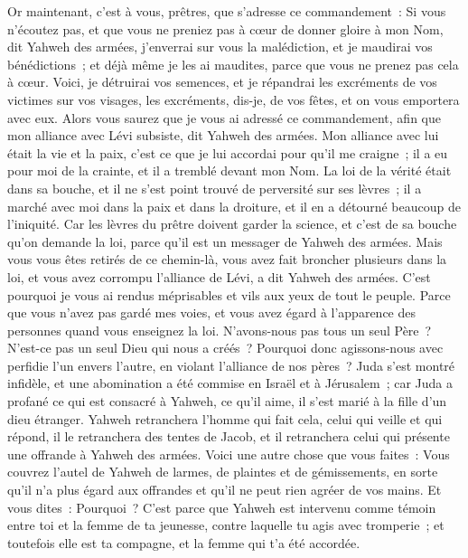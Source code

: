 \begin{multicols}{2}
\VerseOne{}Or maintenant, c'est à vous, prêtres, que s'adresse ce commandement~:
Si vous n'écoutez pas, et que vous ne preniez pas à cœur de donner gloire à mon Nom, dit Yahweh des armées, j'enverrai sur vous la malédiction, et je maudirai vos bénédictions~; et déjà même je les ai maudites, parce que vous ne prenez pas cela à cœur.
Voici, je détruirai vos semences, et je répandrai les excréments de vos victimes sur vos visages, les excréments, dis-je, de vos fêtes, et on vous emportera avec eux.
Alors vous saurez que je vous ai adressé ce commandement, afin que mon alliance avec Lévi subsiste, dit Yahweh des armées.
Mon alliance avec lui était la vie et la paix, c'est ce que je lui accordai pour qu'il me craigne~; il a eu pour moi de la crainte, et il a tremblé devant mon Nom.
La loi de la vérité était dans sa bouche, et il ne s'est point trouvé de perversité sur ses lèvres~; il a marché avec moi dans la paix et dans la droiture, et il en a détourné beaucoup de l'iniquité.
Car les lèvres du prêtre doivent garder la science, et c'est de sa bouche qu'on demande la loi, parce qu'il est un messager de Yahweh des armées.
Mais vous vous êtes retirés de ce chemin-là, vous avez fait broncher plusieurs dans la loi, et vous avez corrompu l'alliance de Lévi, a dit Yahweh des armées.
C'est pourquoi je vous ai rendus méprisables et vils aux yeux de tout le peuple. Parce que vous n'avez pas gardé mes voies, et vous avez égard à l'apparence des personnes quand vous enseignez la loi.
N'avons-nous pas tous un seul Père~? N'est-ce pas un seul Dieu qui nous a créés~? Pourquoi donc agissons-nous avec perfidie l'un envers l'autre, en violant l'alliance de nos pères~?
Juda s'est montré infidèle, et une abomination a été commise en Israël et à Jérusalem~; car Juda a profané ce qui est consacré à Yahweh, ce qu'il aime, il s'est marié à la fille d'un dieu étranger.
Yahweh retranchera l'homme qui fait cela, celui qui veille et qui répond, il le retranchera des tentes de Jacob, et il retranchera celui qui présente une offrande à Yahweh des armées.
Voici une autre chose que vous faites~: Vous couvrez l'autel de Yahweh de larmes, de plaintes et de gémissements, en sorte qu'il n'a plus égard aux offrandes et qu'il ne peut rien agréer de vos mains.
Et vous dites~: Pourquoi~? C'est parce que Yahweh est intervenu comme témoin entre toi et la femme de ta jeunesse, contre laquelle tu agis avec tromperie~; et toutefois elle est ta compagne, et la femme qui t'a été accordée.

\end{multicols}

